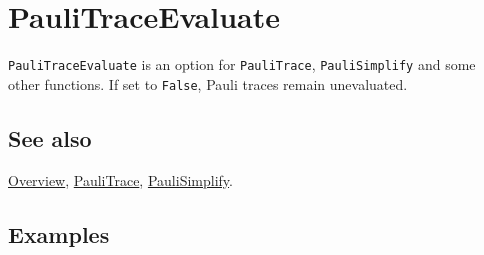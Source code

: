 \documentclass[../FeynCalcManual.tex]{subfiles}
\begin{document}
\hypertarget{paulitraceevaluate}{
\section{PauliTraceEvaluate}\label{paulitraceevaluate}}

\texttt{PauliTraceEvaluate} is an option for \texttt{PauliTrace},
\texttt{PauliSimplify} and some other functions. If set to
\texttt{False}, Pauli traces remain unevaluated.

\subsection{See also}

\hyperlink{toc}{Overview}, \hyperlink{paulitrace}{PauliTrace},
\hyperlink{paulisimplify}{PauliSimplify}.

\subsection{Examples}
\end{document}
